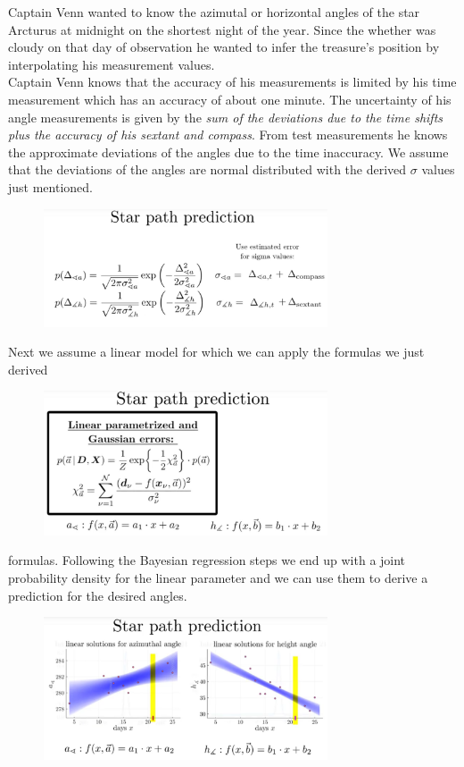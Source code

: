 \documentclass[12pt, a4paper]{scrartcl}
\begin{document}
Captain Venn wanted to know the azimutal or horizontal angles of the
star Arcturus at midnight on the shortest night of the year. Since the whether
was cloudy on that day of observation he wanted to infer the treasure's position
by interpolating his measurement values.\\
Captain Venn knows that the accuracy of his measurements is limited by
his time measurement which has an accuracy of about one minute. 
The uncertainty of his angle measurements is given by the \textit{sum of
the deviations due to the time shifts plus the accuracy of his sextant and compass}.
From test measurements he knows the approximate deviations of the angles due to the time inaccuracy.
We assume that the deviations of the angles are normal distributed with the derived $\sigma$ values just mentioned.%
\begin{figure}[H]
	\centering
	\includegraphics[width=0.75\textwidth]{7_9.png}
\end{figure}
Next we assume a linear model for which we can apply the formulas we just derived%
\begin{figure}[H]
	\centering
	\includegraphics[width=0.75\textwidth]{7_10.png}
\end{figure}
formulas. Following the Bayesian regression steps we end up with a joint
probability density for the linear parameter and we can use them to derive a prediction for the desired angles.%
\begin{figure}[H]
	\centering
	\includegraphics[width=0.75\textwidth]{7_11.png}
\end{figure}
\end{document}
